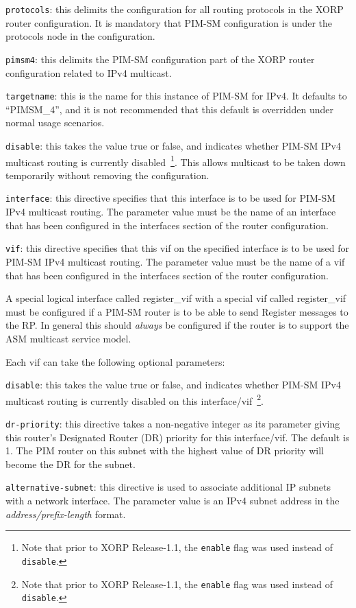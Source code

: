 \begin{description}
\item{\tt protocols}: this delimits the configuration for all routing
  protocols in the XORP router configuration.  It is mandatory that
  PIM-SM configuration is under the {\stt protocols} node in the
  configuration.
\item{\tt pimsm4}: this delimits the PIM-SM configuration part of the XORP
  router configuration related to IPv4 multicast.
\item{\tt targetname}: this is the name for this instance of PIM-SM for
  IPv4.  It defaults to ``{\stt PIMSM\_4}'', and it is not recommended
  that this default is overridden under normal usage scenarios.
\item{\tt disable}: this takes the value {\stt true} or {\stt false},
  and indicates whether PIM-SM IPv4 multicast routing is currently
  disabled~\footnote{Note
  that prior to XORP Release-1.1, the {\tt enable} flag was used instead of
  {\tt disable}.}.
  This allows multicast to be taken down temporarily without
  removing the configuration.
\item{\tt interface}: this directive specifies that this {\stt
  interface} is to be used for PIM-SM IPv4 multicast routing.  The
  parameter value must be the name of an interface that has been
  configured in the {\stt interfaces} section of the router
  configuration.
\item{\tt vif}: this directive specifies that this {\stt vif}
  on the specified {\stt interface} is to be used for PIM-SM IPv4
  multicast routing.  The parameter value must be the name of a vif
  that has been configured in the {\stt interfaces} section of the
  router configuration.

  A special logical interface called {\stt register\_vif} with a
  special vif called {\stt register\_vif} must be configured if a
  PIM-SM router is to be able to send Register messages to the RP.  In
  general this should {\it always} be configured if the router is to
  support the ASM multicast service model.

  Each {\stt vif} can take the following optional parameters:
\begin{description}
\item{\tt disable}: this takes the value {\stt true} or {\stt false},
  and indicates whether PIM-SM IPv4 multicast routing is currently
  disabled on this interface/vif~\footnote{Note
  that prior to XORP Release-1.1, the {\tt enable} flag was used instead of
  {\tt disable}.}.
\item{\tt dr-priority}: this directive takes a non-negative integer as
  its parameter giving this router's Designated Router (DR) priority
  for this interface/vif.  The default is 1.  The PIM router on this
  subnet with the highest value of DR priority will become the DR for
  the subnet.
\item{\tt alternative-subnet}: this directive is used to associate
  additional IP subnets with a network interface. The parameter value
  is an IPv4 subnet address in the {\it address/prefix-length} format.


\end{description}
\end{description}
